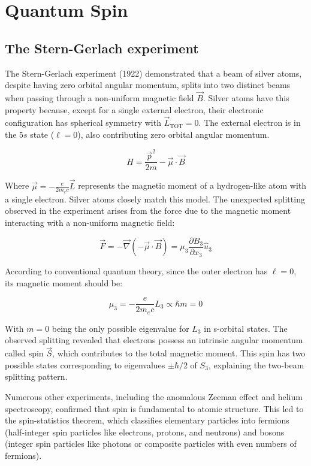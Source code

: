 \chapter{Quantum Spin}

\section{The Stern-Gerlach experiment}
The Stern-Gerlach experiment (1922) demonstrated that a beam of silver atoms, despite having zero orbital angular momentum, splits into two distinct beams when passing through a non-uniform magnetic field $\vec{B}$. Silver atoms have this property because, except for a single external electron, their electronic configuration has spherical symmetry with $\vec{L}_{\text{TOT}}=0$. The external electron is in the $5s$ state ($\ell=0$), also contributing zero orbital angular momentum.


\begin{equation}
H=\frac{\vec{p}^{2}}{2 m}-\vec{\mu} \cdot \vec{B}
\end{equation}

Where $\vec{\mu}=-\frac{e}{2 m_{e} c} \vec{L}$ represents the magnetic moment of a hydrogen-like atom with a single electron. Silver atoms closely match this model. The unexpected splitting observed in the experiment arises from the force due to the magnetic moment interacting with a non-uniform magnetic field:

\begin{equation}
\vec{F}=-\vec{\nabla}(-\vec{\mu} \cdot \vec{B})=\mu_{3} \frac{\partial B_{3}}{\partial x_{3}} \hat{u}_{3}
\end{equation}

According to conventional quantum theory, since the outer electron has $\ell=0$, its magnetic moment should be:

\begin{equation}
\mu_{3}=-\frac{e}{2 m_{e} c} L_{3} \propto \hbar m=0
\end{equation}

With $m=0$ being the only possible eigenvalue for $L_3$ in s-orbital states. The observed splitting revealed that electrons possess an intrinsic angular momentum called spin $\vec{S}$, which contributes to the total magnetic moment. This spin has two possible states corresponding to eigenvalues $\pm\hbar/2$ of $S_3$, explaining the two-beam splitting pattern.

Numerous other experiments, including the anomalous Zeeman effect and helium spectroscopy, confirmed that spin is fundamental to atomic structure. This led to the spin-statistics theorem, which classifies elementary particles into fermions (half-integer spin particles like electrons, protons, and neutrons) and bosons (integer spin particles like photons or composite particles with even numbers of fermions).

